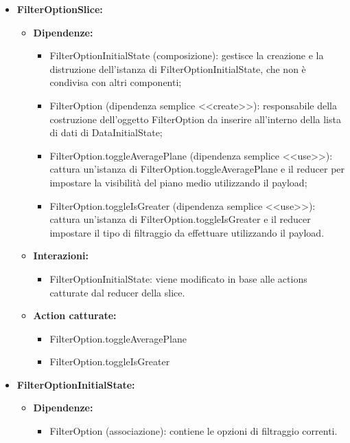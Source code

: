 \begin{itemize}
    \item \textbf{FilterOptionSlice:}
    \begin{itemize}
        \item \textbf{Dipendenze:}
        \begin{itemize}
            \item FilterOptionInitialState (composizione): gestisce la creazione e la distruzione dell'istanza di FilterOptionInitialState, che non è condivisa con altri componenti;
            \item FilterOption (dipendenza semplice <<create>>): responsabile della costruzione dell'oggetto FilterOption da inserire all’interno della lista di dati di DataInitialState;
            \item FilterOption.toggleAveragePlane (dipendenza semplice <<use>>): cattura un’istanza di FilterOption.toggleAveragePlane e il reducer per impostare la visibilità del piano medio utilizzando il payload;
            \item FilterOption.toggleIsGreater (dipendenza semplice <<use>>): cattura un’istanza di FilterOption.toggleIsGreater e il reducer impostare il tipo di filtraggio da effettuare utilizzando il payload.
        \end{itemize} 
        \item \textbf{Interazioni:}
        \begin{itemize}
            \item FilterOptionInitialState: viene modificato in base alle actions catturate dal reducer della slice.
        \end{itemize} 
        \item \textbf{Action catturate:}
        \begin{itemize}
            \item FilterOption.toggleAveragePlane
            \item FilterOption.toggleIsGreater
        \end{itemize} 
    \end{itemize}

    \item \textbf{FilterOptionInitialState:}
    \begin{itemize}
        \item \textbf{Dipendenze:}
        \begin{itemize}
            \item FilterOption (associazione): contiene le opzioni di filtraggio correnti.
        \end{itemize} 
    \end{itemize}


\end{itemize}
